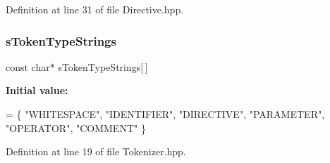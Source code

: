 Definition at line 31 of file Directive.\+hpp.

\mbox{\label{namespaceft_a1b9b00bc284da71346729142b8560e03}} 
\subsubsection{\texorpdfstring{s\+Token\+Type\+Strings}{sTokenTypeStrings}}
{\footnotesize\ttfamily const char$\ast$ s\+Token\+Type\+Strings\mbox{[}$\,$\mbox{]}\hspace{0.3cm}{\ttfamily [static]}}

{\bfseries Initial value\+:}
\begin{DoxyCode}
= \{
        \textcolor{stringliteral}{"WHITESPACE"},
        \textcolor{stringliteral}{"IDENTIFIER"},
        \textcolor{stringliteral}{"DIRECTIVE"},
        \textcolor{stringliteral}{"PARAMETER"},
        \textcolor{stringliteral}{"OPERATOR"},
        \textcolor{stringliteral}{"COMMENT"}
    \}
\end{DoxyCode}


Definition at line 19 of file Tokenizer.\+hpp.

